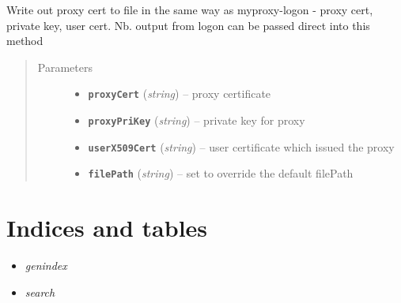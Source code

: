 \documentclass[letterpaper,10pt,english]{sphinxmanual}
\begin{document}
\begin{fulllineitems}
\begin{fulllineitems}
\end{fulllineitems}


\begin{fulllineitems}
\label{client:myproxy.client.MyProxyClient.writeProxyFile}
Write out proxy cert to file in the same way as myproxy-logon - 
proxy cert, private key, user cert.  Nb. output from logon can be
passed direct into this method
\begin{quote}\begin{description}
\item[{Parameters}] \leavevmode\begin{itemize}
\item {} 
\textbf{\texttt{proxyCert}} (\emph{string}) -- proxy certificate

\item {} 
\textbf{\texttt{proxyPriKey}} (\emph{string}) -- private key for proxy

\item {} 
\textbf{\texttt{userX509Cert}} (\emph{string}) -- user certificate which issued the proxy

\item {} 
\textbf{\texttt{filePath}} (\emph{string}) -- set to override the default filePath

\end{itemize}

\end{description}\end{quote}

\end{fulllineitems}


\end{fulllineitems}



\chapter{Indices and tables}
\label{index:indices-and-tables}\begin{itemize}
\item {} 
\emph{genindex}

\item {} 
\emph{search}

\end{itemize}



\renewcommand{\indexname}{Index}
\printindex
\end{document}

